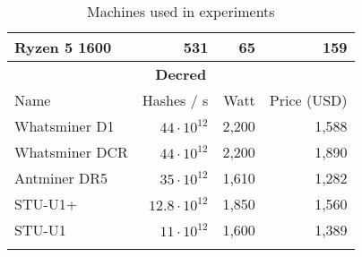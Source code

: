 \begin{longtable}{|p{}|r|r|r|}
  Ryzen 5 1600 & 531 & 65 & 159 \\
  \hline
  \multicolumn{4}{|c|}{\textbf{Decred}} \\
  \hline
  Name & Hashes / s & Watt & Price (USD) \\
  \hhline{|=|=|=|=|}
  Whatsminer D1 & $44 \cdot 10^{12}$ & 2,200 & 1,588 \\
  Whatsminer DCR & $44 \cdot 10^{12}$ & 2,200 & 1,890 \\
  Antminer DR5 & $35 \cdot 10^{12}$ & 1,610 & 1,282 \\
  STU-U1+ & $12.8 \cdot 10^{12}$ & 1,850 & 1,560 \\
  STU-U1 & $11 \cdot 10^{12}$ & 1,600 & 1,389 \\
  \hline
\caption{Machines used in experiments}
\label{tbl:machines}
\end{longtable}
